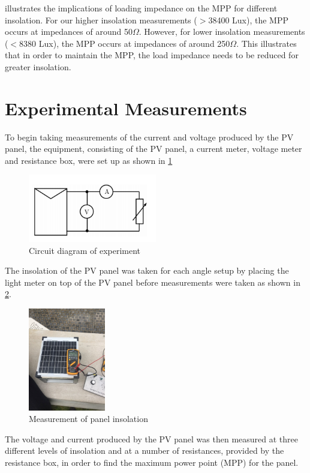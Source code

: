 \documentclass{article}
\begin{document}
		 illustrates the implications of loading impedance on the MPP for different insolation. For our higher insolation measurements ($>$38400 Lux), the MPP occurs at impedances of around 50$ \Omega $. However, for lower insolation measurements ($<$8380 Lux), the MPP occurs at impedances of around 250$ \Omega $. This illustrates that in order to maintain the MPP, the load impedance needs to be reduced for greater insolation.
	
	\section{Experimental Measurements}
		To begin taking measurements of the current and voltage produced by the PV panel, the equipment, consisting of the PV panel, a current meter, voltage meter and resistance box, were set up as shown in \cref{fig:circuit}
		\begin{figure}[H]
			\centering
			\includegraphics[width=0.5\textwidth]{circuitdiagram}
			\caption{Circuit diagram of experiment}
			\label{fig:circuit}
		\end{figure}
		The insolation of the PV panel was taken for each angle setup by placing the light meter on top of the PV panel before measurements were taken as shown in \cref{fig:lux_reading}.
		\begin{figure}[H]
			\centering
			\includegraphics[width=0.3\textwidth]{lux_reading}
			\caption{Measurement of panel insolation}
			\label{fig:lux_reading}
		\end{figure}
		The voltage and current produced by the PV panel was then measured at three different levels of insolation and at a number of resistances, provided by the resistance box, in order to find the maximum power point (MPP) for the panel.
		
\end{document}
